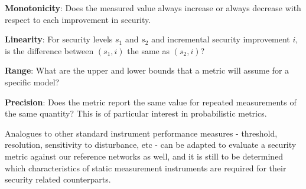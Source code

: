 \textbf{Monotonicity}: Does the measured value always increase or always decrease with respect to each improvement in security.

\textbf{Linearity}: For security levels $s_1$ and $s_2$ and incremental security improvement $i$, is the difference between $(s_1,i)$ the same as $(s_2,i)$?

\textbf{Range}: What are the upper and lower bounds that a metric will assume for a specific model?

\textbf{Precision}: Does the metric report the same value for repeated measurements of the same quantity? This is of particular interest in probabilistic metrics. 

Analogues to other standard instrument performance measures - threshold, resolution, sensitivity to disturbance, etc - can be adapted to evaluate a security metric against our reference networks as well, and it is still to be determined which characteristics of static measurement instruments are required for their security related counterparts. 

